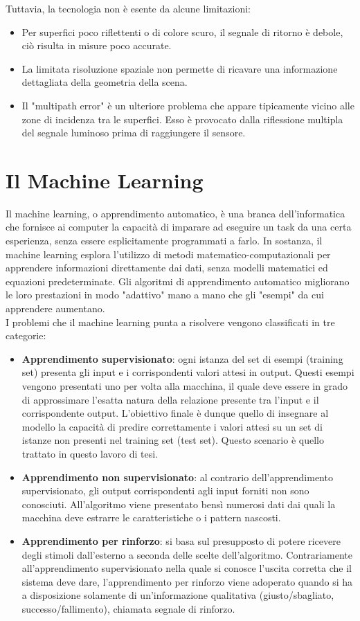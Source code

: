 Tuttavia, la tecnologia non è esente da alcune limitazioni: 
\begin{itemize}
    \item Per superfici poco riflettenti o di colore scuro, il segnale di ritorno è debole, ciò risulta in misure poco accurate. 
    \item La limitata risoluzione spaziale non permette di ricavare una informazione dettagliata della geometria della scena.
    \item Il "multipath error" è un ulteriore problema che appare tipicamente vicino alle zone di incidenza tra le superfici. Esso è provocato dalla riflessione multipla del segnale luminoso prima di raggiungere il sensore. 
\end{itemize}

\section{Il Machine Learning}
Il machine learning, o apprendimento automatico, è una branca dell'informatica che fornisce ai computer la capacità di imparare ad eseguire un task da una certa esperienza, senza essere esplicitamente programmati a farlo. In sostanza, il machine learning esplora l'utilizzo di metodi matematico-computazionali per apprendere informazioni direttamente dai dati, senza modelli matematici ed equazioni predeterminate. Gli algoritmi di apprendimento automatico migliorano le loro prestazioni in modo "adattivo" mano a mano che gli "esempi" da cui apprendere aumentano. \\
I problemi che il machine learning punta a risolvere vengono classificati in tre categorie:
\begin{itemize}
    \item \textbf{Apprendimento supervisionato}: ogni istanza del set di esempi (training set) presenta gli input e i corrispondenti valori attesi in output. Questi esempi vengono presentati uno per volta alla macchina, il quale deve essere in grado di approssimare l'esatta natura della relazione presente tra l'input e il corrispondente output. L’obiettivo finale è dunque quello di insegnare al modello la capacità di predire correttamente i valori attesi su un set di istanze non presenti nel training set (test set). Questo scenario è quello trattato in questo lavoro di tesi.
    \item \textbf{Apprendimento non supervisionato}: al contrario dell'apprendimento supervisionato, gli output corrispondenti agli input forniti non sono conosciuti. All'algoritmo viene presentato bensì numerosi dati dai quali la macchina deve estrarre le caratteristiche o i pattern nascosti. 
    \item \textbf{Apprendimento per rinforzo}: si basa sul presupposto di potere ricevere degli stimoli dall'esterno a seconda delle scelte dell'algoritmo. Contrariamente all’apprendimento supervisionato nella quale si conosce l’uscita corretta che il sistema deve dare, l’apprendimento per rinforzo viene adoperato quando si ha a disposizione solamente di un’informazione qualitativa (giusto/sbagliato, successo/fallimento), chiamata segnale di rinforzo.
\end{itemize}
